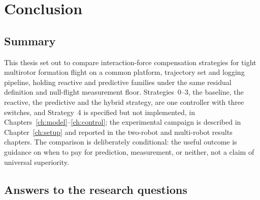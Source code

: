 %
%
%

\chapter{Conclusion}
\label{ch:conclusion}

\section{Summary}
\label{sec:conclusion-summary}

This thesis set out to compare interaction-force compensation strategies for tight multirotor
formation flight on a common platform, trajectory set and logging pipeline, holding reactive and
predictive families under the same residual definition and null-flight measurement floor.
Strategies~0--3, the baseline, the reactive, the predictive and the hybrid strategy, are one
controller with three switches, and Strategy~4 is specified but not implemented, in
Chapters~\ref{ch:model}--\ref{ch:control}; the experimental
campaign is described in Chapter~\ref{ch:setup} and reported in the two-robot and
multi-robot results chapters. The comparison is deliberately conditional: the useful outcome is guidance
on when to pay for prediction, measurement, or neither, not a claim of universal superiority.

\section{Answers to the research questions}
\label{sec:conclusion-rq}

